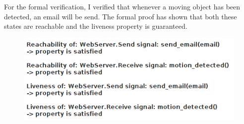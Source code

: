 \documentclass{article}
\begin{document}
For the formal verification, I verified that whenever a moving object has been
detected, an email will be send. The formal proof has shown that both these states
are reachable and the liveness property is guaranteed.
\begin{figure}[!h]
  \centering
  \includegraphics[width = \textwidth]{./formal_verification.png}
\end{figure}
\end{document}

